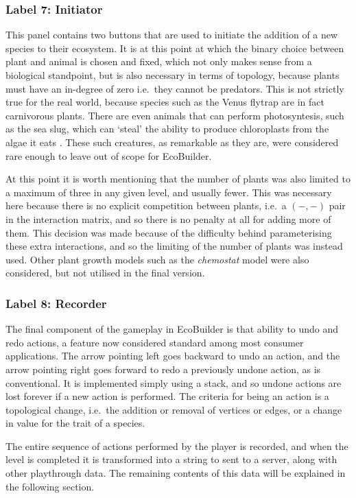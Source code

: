 \subsubsection{Label 7: Initiator}
This panel contains two buttons that are used to initiate the addition of a new species to their ecosystem.
It is at this point at which the binary choice between plant and animal is chosen and fixed, which not only makes sense from a biological standpoint, but is also necessary in terms of topology, because plants must have an in-degree of zero i.e.\ they cannot be predators. This is not strictly true for the real world, because species such as the Venus flytrap are in fact carnivorous plants. There are even animals that can perform photosyntesis, such as the sea slug, which can `steal' the ability to produce chloroplasts from the algae it eats \citep{Rumpho2008}.
These such creatures, as remarkable as they are, were considered rare enough to leave out of scope for EcoBuilder.

At this point it is worth mentioning that the number of plants was also limited to a maximum of three in any given level, and usually fewer. This was necessary here because there is no explicit competition between plants, i.e.\ a $(-,-)$ pair in the interaction matrix, and so there is no penalty at all for adding more of them.
This decision was made because of the difficulty behind parameterising these extra interactions, and so the limiting of the number of plants was instead used. Other plant growth models such as the \emph{chemostat} model \citep{Sommer1983} were also considered, but not utilised in the final version.

\subsubsection{Label 8: Recorder}
The final component of the gameplay in EcoBuilder is that ability to undo and redo actions, a feature now considered standard among most consumer applications. The arrow pointing left goes backward to undo an action, and the arrow pointing right goes forward to redo a previously undone action, as is conventional. It is implemented simply using a stack, and so undone actions are lost forever if a new action is performed.
The criteria for being an action is a topological change, i.e.\ the addition or removal of vertices or edges, or a change in value for the trait of a species.

The entire sequence of actions performed by the player is recorded, and when the level is completed it is transformed into a string to sent to a server, along with other playthrough data. The remaining contents of this data will be explained in the following section.

